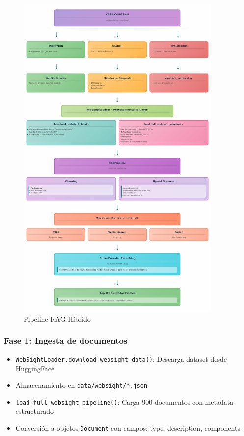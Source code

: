 \documentclass[12pt,a4paper]{article}
\begin{document}
\begin{figure}[H]
\centering
\includegraphics[width=0.9\textwidth]{../docs/diagrama-flujo-rag-pipeline.png}
\caption{Pipeline RAG Híbrido}
\label{fig:rag}
\end{figure}

\subsubsection{Fase 1: Ingesta de documentos}
\begin{itemize}
    \item \texttt{WebSightLoader.download\_websight\_data()}: Descarga dataset desde HuggingFace
    \item Almacenamiento en \texttt{data/websight/*.json}
    \item \texttt{load\_full\_websight\_pipeline()}: Carga 900 documentos con metadata estructurado
    \item Conversión a objetos \texttt{Document} con campos: type, description, components
\end{itemize}
\end{document}
